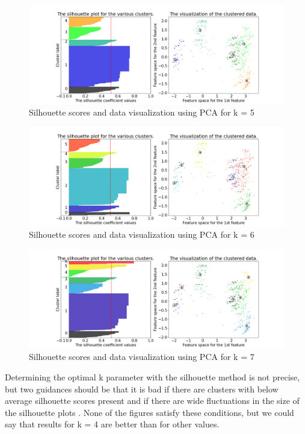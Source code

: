 \documentclass[times, utf8, zavrsni, numeric]{fer}
\begin{document}
  \begin{figure}[H]
    \centering
    \includegraphics[width=\linewidth]{figures/silhouette_5}
    \caption{Silhouette scores and data visualization using PCA for k = 5}
    \label{fig:silhouette4}
  \end{figure}

  \begin{figure}[H]
    \centering
    \includegraphics[width=\linewidth]{figures/silhouette_6}
    \caption{Silhouette scores and data visualization using PCA for k = 6}
    \label{fig:silhouette5}
  \end{figure}

  \begin{figure}[H]
    \centering
    \includegraphics[width=\linewidth]{figures/silhouette_7}
    \caption{Silhouette scores and data visualization using PCA for k = 7}
    \label{fig:silhouette6}
  \end{figure}

Determining the optimal k parameter with the silhouette method is not 
precise, but two guidances should be that it is bad if there are
clusters with below average silhouette scores present and if there are 
wide fluctuations in the size of the silhouette plots \cite{silhouetteDet}. None of the 
figures satisfy these conditions, but we could say that results for 
k = 4 are better than for other values. 
\end{document}
